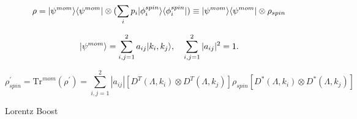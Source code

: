 \begin{equation}
    \rho = \lvert\psi^{mom}\rangle\langle\psi^{mom}\rvert \otimes (\sum_{i} p_i\lvert\phi_i^{spin}\rangle\langle\phi_i^{spin}\rvert) \equiv \lvert\psi^{mom}\rangle\langle\psi^{mom}\rvert \otimes \rho_{spin}
\end{equation}

\begin{equation}
    \lvert\psi^{mom}\rangle = \sum_{i,j=1}^{2}a_{ij}\lvert k_i,k_j\rangle, \quad \sum_{i,j=1}^{2}|a_{ij}|^2 = 1.
\end{equation}

\begin{equation}
    \rho^\prime_{spin} = \text{Tr}^{mom}(\rho^\prime) = \sum_{i,j=1}^{2}|a_{ij}|[D^T(\Lambda,k_i) \otimes D^T(\Lambda,k_j)]\rho_{spin}[D^*(\Lambda,k_i) \otimes D^*(\Lambda,k_j)]
\end{equation}

Lorentz Boost
